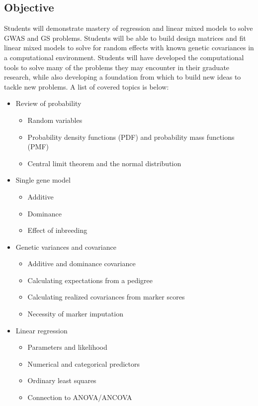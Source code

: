 \documentclass[10pt]{article}
\begin{document}
\subsection*{Objective}

Students will demonstrate mastery of regression and linear mixed models to solve GWAS and GS problems. Students will be able to build design matrices and fit linear mixed models to solve for random effects with known genetic covariances in a computational environment. Students will have developed the computational tools to solve many of the problems they may encounter in their graduate research, while also developing a foundation from which to build new ideas to tackle new problems. A list of covered topics is below:

\begin{itemize}

	\item Review of probability
	\begin{itemize}
		\item Random variables
		\item Probability density functions (PDF) and probability mass functions (PMF)
		\item Central limit theorem and the normal distribution
	\end{itemize} 

	\item Single gene model 
	\begin{itemize}
		\item Additive
		\item Dominance 
		\item Effect of inbreeding
	\end{itemize} 

	\item Genetic variances and covariance
	\begin{itemize}
		\item Additive and dominance covariance
		\item Calculating expectations from a pedigree 
		\item Calculating realized covariances from marker scores
		\item Necessity of marker imputation
	\end{itemize} 

	\item Linear regression
	\begin{itemize}
		\item Parameters and likelihood
		\item Numerical and categorical predictors 
		\item Ordinary least squares
		\item Connection to ANOVA/ANCOVA
	\end{itemize} 


\end{itemize}
\end{document}
